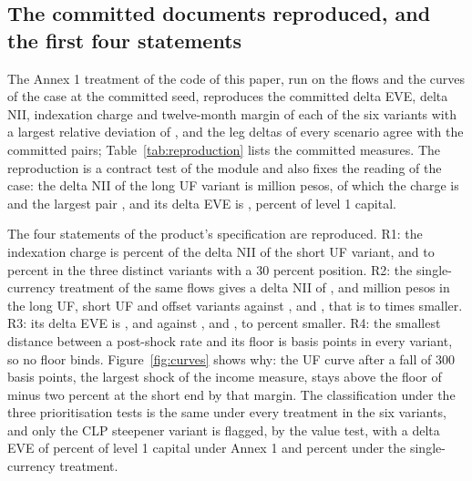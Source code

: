 \subsection{The committed documents reproduced, and the first four statements}
\label{sec:results-reproduction}

The Annex 1 treatment of the code of this paper, run on the flows and the curves of the case at the committed seed, reproduces the committed delta EVE, delta NII, indexation charge and twelve-month margin of each of the six variants with a largest relative deviation of \repMaxDev{}, and the leg deltas of every scenario agree with the committed pairs; Table~\ref{tab:reproduction} lists the committed measures. The reproduction is a contract test of the module and also fixes the reading of the case: the delta NII of the long UF variant is \repAnnexNiiLng{} million pesos, of which the charge is \repChargeLng{} and the largest pair \repMaxPairLng{}, and its delta EVE is \repAnnexEveLng{}, \repEveTLng{} percent of level 1 capital.



The four statements of the product's specification are reproduced. R1: the indexation charge is \repChargeShareSht{} percent of the delta NII of the short UF variant, and \repChargeShareLo{} to \repChargeShareHi{} percent in the three distinct variants with a 30 percent position. R2: the single-currency treatment of the same flows gives a delta NII of \repSingleNiiLng{}, \repSingleNiiSht{} and \repSingleNiiOff{} million pesos in the long UF, short UF and offset variants against \repAnnexNiiLng{}, \repAnnexNiiSht{} and \repAnnexNiiOff{}, that is \repRatioLo{} to \repRatioHi{} times smaller. R3: its delta EVE is \repSingleEveLng{}, \repSingleEveSht{} and \repSingleEveOff{} against \repAnnexEveLng{}, \repAnnexEveSht{} and \repAnnexEveOff{}, \repEveShortLo{} to \repEveShortHi{} percent smaller. R4: the smallest distance between a post-shock rate and its floor is \repFloorDistLng{} basis points in every variant, so no floor binds. Figure~\ref{fig:curves} shows why: the UF curve after a fall of 300 basis points, the largest shock of the income measure, stays above the floor of minus two percent at the short end by that margin. The classification under the three prioritisation tests is the same under every treatment in the six variants, and only the CLP steepener variant is flagged, by the value test, with a delta EVE of \repEveTStp{} percent of level 1 capital under Annex 1 and \repEveTSingleStp{} percent under the single-currency treatment.

